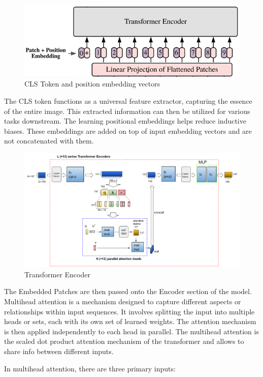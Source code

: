 \begin{figure}[htbp]
    \centering
    \includegraphics[width=5in]{img/CLS token.png}
    \caption{{CLS Token and position embedding vectors}}
\end{figure}

\noindent The CLS token functions as a universal feature extractor, capturing the essence of the entire image. This extracted information can then be utilized for various tasks downstream. The learning positional embeddings helps reduce inductive biases. These embeddings are added on top of input embedding vectors and are not concatenated with them.

\begin{figure}[htbp]
    \centering
    \includegraphics[width=6.3in]{img/transformer_encoder.png}
    \caption{{Transformer Encoder}}
\end{figure}
\noindent The Embedded Patches are then passed onto the Encoder section of the model. Multihead attention is a mechanism designed to capture different aspects or relationships within input sequences. It involves splitting the input into multiple heads or sets, each with its own set of learned weights. The attention mechanism is then applied independently to each head in parallel. The multihead attention is the scaled dot product attention mechanism of the transformer and allows to share info between different inputs.

\noindent In multihead attention, there are three primary inputs:

